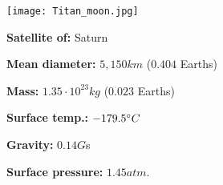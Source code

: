 \begin{tcolorbox}[colback=red!5,colframe=DarkRed!40!black,title=Titan \cite{Titan}]

{\centering
\texttt{[image: Titan\_moon.jpg]}
\par}

\textbf{Satellite of:} Saturn

\textbf{Mean diameter:} $5,150km$ ($0.404$ Earths)

\textbf{Mass:} $1.35\cdot 10^{23}kg$ ($0.023$ Earths)

\textbf{Surface temp.:} $-179.5\degree C$

\textbf{Gravity:} $0.14 G$s

\textbf{Surface pressure:} $1.45 atm.$
\end{tcolorbox}

